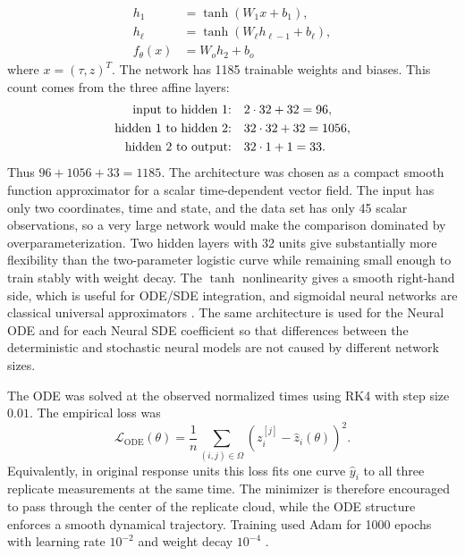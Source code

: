 \begin{equation}
    \label{eqn:activation_functions}
    \begin{aligned}
        h_1 &=
            \tanh(W_1 x+b_1),
        \\
        h_{\ell}
            &=
                \tanh(W_{\ell}h_{\ell-1}+b_{\ell}),
        \\
        f_\theta(x)
            &=
                W_o h_2+b_o
    \end{aligned}
\end{equation}
where $x=(\tau,z)^T$. The network has 1185 trainable weights and biases.
This count comes from the three affine layers:
$$
\begin{aligned}
  \hbox{input to hidden 1:}&\quad 2\cdot 32+32=96,\\
  \hbox{hidden 1 to hidden 2:}&\quad 32\cdot 32+32=1056,\\
  \hbox{hidden 2 to output:}&\quad 32\cdot 1+1=33.
\end{aligned}
$$
Thus $96+1056+33=1185$. The architecture was chosen as a compact smooth
function approximator for a scalar time-dependent vector field. The input has
only two coordinates, time and state, and the data set has only 45 scalar
observations, so a very large network would make the comparison dominated by
overparameterization. Two hidden layers with 32 units give substantially more
flexibility than the two-parameter logistic curve while remaining small enough
to train stably with weight decay. The $\tanh$ nonlinearity gives a smooth
right-hand side, which is useful for ODE/SDE integration, and sigmoidal neural
networks are classical universal approximators \citep{cybenko1989approximation}.
The same architecture is used for the Neural ODE and for each Neural SDE
coefficient so that differences between the deterministic and stochastic neural
models are not caused by different network sizes.

The ODE was solved at the observed normalized times using RK4 with step size
$0.01$. The empirical loss was
$$
  \mathcal L_{\mathrm{ODE}}(\theta)
  =
  \frac{1}{n}
  \sum_{(i,j)\in\Omega}
  \left(z_i^{[j]}-\widehat z_i(\theta)\right)^2.
$$
Equivalently, in original response units this loss fits one curve
$\widehat y_i$ to all three replicate measurements at the same time. The
minimizer is therefore encouraged to pass through the center of the replicate
cloud, while the ODE structure enforces a smooth dynamical trajectory.
Training used Adam for 1000 epochs with learning rate $10^{-2}$ and weight
decay $10^{-4}$ \citep{kingma2015adam}.
